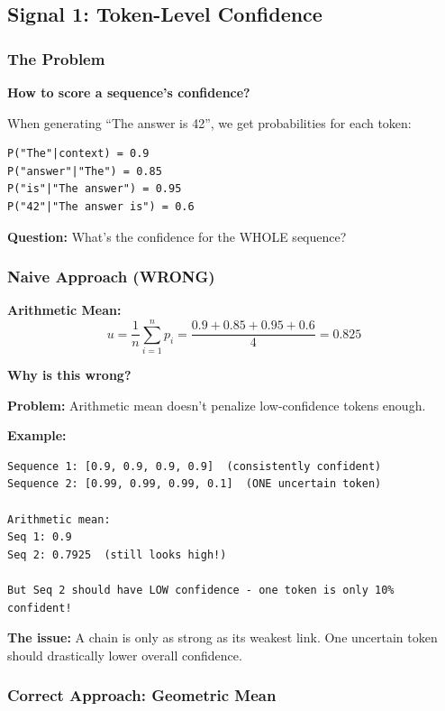 \documentclass[12pt,a4paper]{article}
\theoremstyle{definition}
\begin{document}
\subsection{Signal 1: Token-Level Confidence}

\subsubsection{The Problem}

\begin{problembox}
\textbf{How to score a sequence's confidence?}

When generating ``The answer is 42'', we get probabilities for each token:
\begin{verbatim}
P("The"|context) = 0.9
P("answer"|"The") = 0.85
P("is"|"The answer") = 0.95
P("42"|"The answer is") = 0.6
\end{verbatim}

\textbf{Question:} What's the confidence for the WHOLE sequence?
\end{problembox}

\subsubsection{Naive Approach (WRONG)}

\textbf{Arithmetic Mean:}
\begin{equation}
u = \frac{1}{n} \sum_{i=1}^n p_i = \frac{0.9 + 0.85 + 0.95 + 0.6}{4} = 0.825
\end{equation}

\begin{whybox}
\textbf{Why is this wrong?}

\textbf{Problem:} Arithmetic mean doesn't penalize low-confidence tokens enough.

\textbf{Example:}
\begin{verbatim}
Sequence 1: [0.9, 0.9, 0.9, 0.9]  (consistently confident)
Sequence 2: [0.99, 0.99, 0.99, 0.1]  (ONE uncertain token)

Arithmetic mean:
Seq 1: 0.9
Seq 2: 0.7925  (still looks high!)

But Seq 2 should have LOW confidence - one token is only 10% confident!
\end{verbatim}

\textbf{The issue:} A chain is only as strong as its weakest link. One uncertain token should drastically lower overall confidence.
\end{whybox}

\subsubsection{Correct Approach: Geometric Mean}
\end{document}
